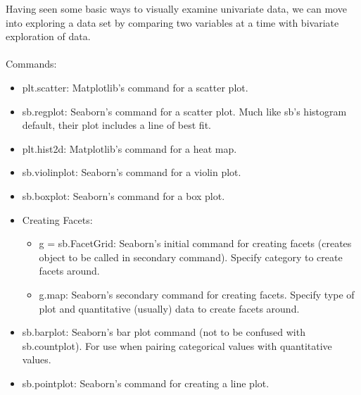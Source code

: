 Having seen some basic ways to visually examine univariate data, we can move into exploring a data set by comparing two variables at a time with bivariate exploration of data.
\\\\
Commands:
\begin{itemize}
	\item plt.scatter: Matplotlib's command for a scatter plot.
	\item sb.regplot: Seaborn's command for a scatter plot. Much like sb's histogram default, their plot includes a line of best fit.
	\item plt.hist2d: Matplotlib's command for a heat map.
	\item sb.violinplot: Seaborn's command for a violin plot.
	\item sb.boxplot: Seaborn's command for a box plot.
	\item Creating Facets:
	\begin{itemize}
		\item g = sb.FacetGrid: Seaborn's initial command for creating facets (creates object to be called in secondary command). Specify category to create facets around.
		\item g.map: Seaborn's secondary command for creating facets. Specify type of plot and quantitative (usually) data to create facets around.
	\end{itemize}
	\item sb.barplot: Seaborn's bar plot command (not to be confused with sb.countplot). For use when pairing categorical values with quantitative values.
	\item sb.pointplot: Seaborn's command for creating a line plot.
\end{itemize}

